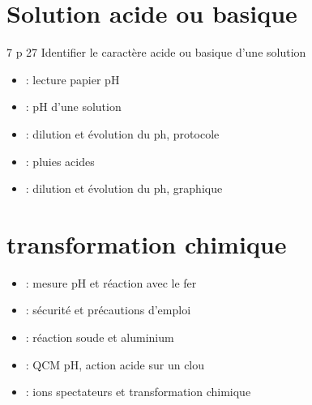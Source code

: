 \documentclass[12pt,a4paper]{article}
\date{}
\title{}
\begin{document}
	
	


	

\section{Solution acide ou basique}

\begin{myact}{7 p 27}
	Identifier le caractère acide ou basique d'une solution
\end{myact}




\begin{myexos}
	\begin{itemize}
		\item {} : lecture papier pH
		\item {} : pH d'une solution
		\item {} : dilution et évolution du ph, protocole
		\item {} : pluies acides
		\item {} : dilution et évolution du ph, graphique
	\end{itemize}
	
\end{myexos}



\section{transformation chimique}



\begin{myexos}
	\begin{itemize}
		\item {} : mesure pH et réaction avec le fer
		\item {} : sécurité et précautions d'emploi
		\item {} : réaction soude et aluminium
		\item {} : QCM pH, action acide sur un clou
		\item {} : ions spectateurs et transformation chimique
	\end{itemize}
	
\end{myexos}




\end{document}
